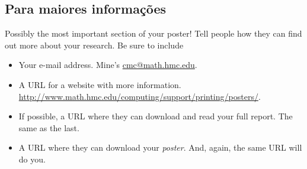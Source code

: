 \documentclass[thesis]{hmcposter}
\begin{document}
\begin{poster}
\section{Para maiores informações}

Possibly the most important section of your poster!  Tell people
how they can find out more about your research.  Be sure to
include
\begin{itemize}
\item Your e-mail address.  Mine's \url{cmc@math.hmc.edu}.
\item A URL for a website with more information.  \url{http://www.math.hmc.edu/computing/support/printing/posters/}.
\item If possible, a URL where they can download and read your full
  report.  The same as the last.
\item A URL where they can download your \emph{poster}.  And, again,
  the same URL will do you.
\end{itemize}

\cite{einstein}


\printbibliography

%
%

%
%

\end{poster}
\end{document}
